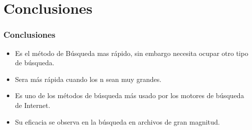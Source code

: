 \documentclass[hyperref={pdfpagelabels=false}]{beamer}
\begin{document}
\section{Conclusiones}
\begin{frame}
\frametitle{Conclusiones}
\begin{itemize}
\item Es el m\'etodo de B\'usqueda mas r\'apido, sin embargo necesita ocupar otro tipo de b\'usqueda.
\item Sera m\'as r\'apida cuando los n sean muy grandes.
\item Es uno de los m\'etodos de b\'usqueda m\'as usado por los motores de b\'usqueda de Internet.
\item Su eficacia se observa en la b\'usqueda en archivos de gran magnitud.
\end{itemize}
\end{frame}
\end{document}
